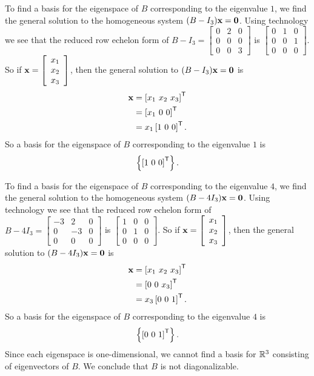\begin{example}
To find a basis for the eigenspace of $B$ corresponding to the eigenvalue $1$, we find the general solution to the homogeneous system $(B - I_3)\mathbf{x} = \mathbf{0}$. Using technology we see that the reduced row echelon form of $B - I_3 =  \left[ \begin{array}{ccc} 0&2&0 \\ 0&0&0 \\ 0&0&3 \end{array} \right]$ is $\left[ \begin{array}{ccc} 0&1&0 \\ 0&0&1 \\ 0&0&0 \end{array} \right]$. So if $\mathbf{x} = \left[ \begin{array}{c} x_1 \\ x_2 \\ x_3 \end{array} \right]$, then the general solution to $(B-I_3)\mathbf{x} = \mathbf{0}$ is
\begin{align*}
\mathbf{x} &= \left[ x_1 \ x_2 \ x_3\right]^{\mathsf{T}} \\
	&= \left[  x_1 \ 0 \ 0  \right]^{\mathsf{T}} \\
	&= x_1 \left[ 1 \ 0 \ 0 \right]^{\mathsf{T}}.
\end{align*}
So a basis for the eigenspace of $B$ corresponding to the eigenvalue $1$ is 
\[\left\{ \left[ 1 \ 0 \ 0 \right]^{\mathsf{T}}\right\}.\]

To find a basis for the eigenspace of $B$ corresponding to the eigenvalue $4$, we find the general solution to the homogeneous system $(B - 4I_3)\mathbf{x} = \mathbf{0}$. Using technology we see that the reduced row echelon form of $B - 4I_3 =  \left[ \begin{array}{rrc} -3&2&0 \\ 0&-3&0 \\ 0&0&0 \end{array} \right]$ is $\left[ \begin{array}{ccc} 1&0&0 \\ 0&1&0 \\ 0&0&0 \end{array} \right]$. So if $\mathbf{x} = \left[ \begin{array}{c} x_1 \\ x_2 \\ x_3 \end{array} \right]$, then the general solution to $(B-4I_3)\mathbf{x} = \mathbf{0}$ is
\begin{align*}
\mathbf{x} &= \left[ x_1 \ x_2 \ x_3  \right]^{\mathsf{T}} \\
	&= \left[  0 \ 0 \ x_3  \right]^{\mathsf{T}} \\
	&= x_3 \left[  0\ 0 \ 1  \right]^{\mathsf{T}}.
\end{align*}
So a basis for the eigenspace of $B$ corresponding to the eigenvalue $4$ is 
\[\left\{ \left[ 0 \ 0 \ 1  \right]^{\tr}\right\}.\]
Since each eigenspace is one-dimensional, we cannot find a basis for $\mathbb{R}^3$ consisting of eigenvectors of $B$. We conclude that $B$ is not diagonalizable. 



\end{example}
